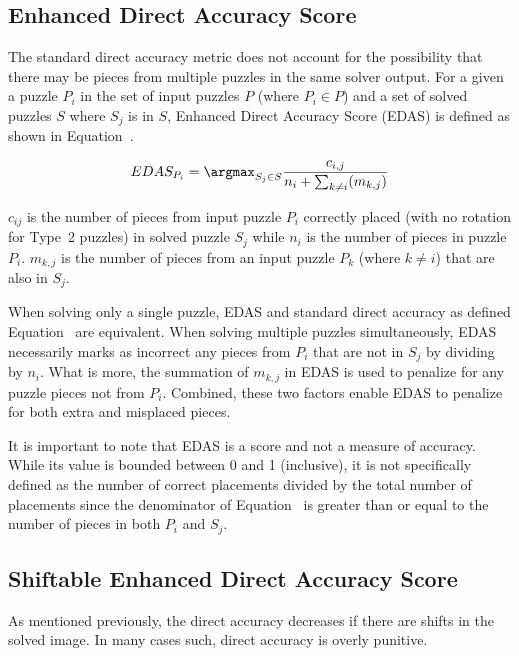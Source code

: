\subsection{Enhanced Direct Accuracy Score}\label{sec:enhancedDirectAccuracyScore}

The standard direct accuracy metric does not account for the possibility that there may be pieces from multiple puzzles in the same solver output.  For a given a puzzle $P_i$ in the set of input puzzles $P$ (where $P_i \in P$) and a set of solved puzzles $S$ where $S_j$ is in $S$, Enhanced Direct Accuracy Score (EDAS) is defined as shown in Equation~.

\begin{equation} \label{eq:enhancedDirectAccuracyScore}
EDAS_{P_i} = \argmax_{S_j \in S}\frac{c_{i,j}}{n_i + \sum_{k \ne i}(m_{k,j})}
\end{equation}

\noindent
$c_{ij}$ is the number of pieces from input puzzle $P_i$ correctly placed (with no rotation for Type~2 puzzles) in solved puzzle $S_j$ while $n_i$ is the number of pieces in puzzle $P_i$. $m_{k,j}$ is the number of pieces from an input puzzle $P_k$ (where $k \ne i$) that are also in $S_j$.

When solving only a single puzzle, EDAS and standard direct accuracy as defined Equation~ are equivalent.  When solving multiple puzzles simultaneously, EDAS necessarily marks as incorrect any pieces from $P_i$ that are not in $S_j$ by dividing by $n_i$.  What is more, the summation of $m_{k,j}$ in EDAS is used to penalize for any puzzle pieces not from $P_i$.  Combined, these two factors enable EDAS to penalize for both extra and misplaced pieces.

It is important to note that EDAS is a score and not a measure of accuracy. While its value is bounded between 0 and 1 (inclusive), it is not specifically defined as the number of correct placements divided by the total number of placements since the denominator of Equation~ is greater than or equal to the number of pieces in both $P_i$ and $S_j$.

\subsection{Shiftable Enhanced Direct Accuracy Score}\label{sec:shiftableEnhancedDirectAccuracy}

As mentioned previously, the direct accuracy decreases if there are shifts in the solved image.  In many cases such, direct accuracy is overly punitive. 

